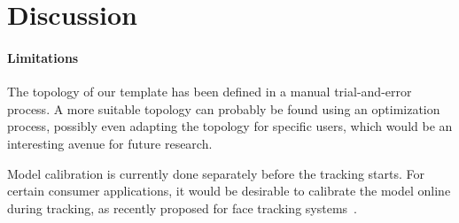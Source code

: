 

\section{Discussion}
\label{sec:discussion}



\paragraph{Limitations}


The topology of our template has been defined in a manual trial-and-error process. A more suitable topology can probably be found using an optimization process, possibly even adapting the topology for specific users, which would be an interesting avenue for future research.

Model calibration is currently done separately before the tracking starts. For certain consumer applications, it would be desirable to calibrate the model online during tracking, as recently proposed for face tracking systems~\cite{sofien, others}.



